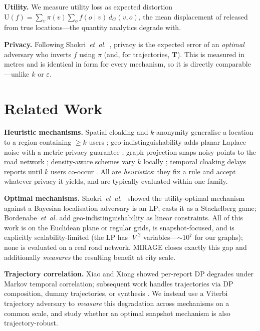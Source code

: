 \documentclass[11pt]{article}
\newcommand{\dG}{d_{G}}
\begin{document}
\textbf{Utility.} We measure utility loss as expected distortion
$\mathrm{U}(f)=\sum_v \pi(v)\sum_o f(o\mid v)\,\dG(v,o)$, the mean displacement of
released from true locations---the quantity analytics degrade with.

\textbf{Privacy.} Following Shokri~\emph{et~al.}~\cite{shokri2011}, privacy is the
expected error of an \emph{optimal} adversary who inverts $f$ using $\pi$ (and,
for trajectories, $\mathbf{T}$). This is measured in metres and is identical in
form for every mechanism, so it is directly comparable---unlike $k$ or
$\varepsilon$.

\section{Related Work}
\label{sec:related}
\textbf{Heuristic mechanisms.} Spatial cloaking and $k$-anonymity generalise a
location to a region containing $\ge k$ users \cite{sweeney2002,gruteser2003,
mokbel2006,duckham2005}; geo-indistinguishability adds planar Laplace noise with a
metric privacy guarantee \cite{andres2013,chatzikokolakis2013}; graph projection
snaps noisy points to the road network \cite{bordenabe2014}; density-aware schemes
vary $k$ locally \cite{niu2014}; temporal cloaking delays reports until $k$ users
co-occur \cite{gruteser2003}. All are \emph{heuristics}: they fix a rule and
accept whatever privacy it yields, and are typically evaluated within one family.

\textbf{Optimal mechanisms.} Shokri~\emph{et~al.}~\cite{shokri2012} showed the
utility-optimal mechanism against a Bayesian localisation adversary is an LP;
\cite{shokri2015pets} casts it as a Stackelberg game; Bordenabe~\emph{et~al.}
\cite{bordenabe2014} add geo-indistinguishability as linear constraints. All of
this work is on the Euclidean plane or regular grids, is snapshot-focused, and is
explicitly scalability-limited (the LP has $|V|^2$ variables---$\sim$$10^7$ for
our graphs); none is evaluated on a real road network. MIRAGE closes exactly this
gap and additionally \emph{measures} the resulting benefit at city scale.

\textbf{Trajectory correlation.} Xiao and Xiong \cite{xiao2015} showed per-report
DP degrades under Markov temporal correlation; subsequent work handles
trajectories via DP composition, dummy trajectories, or synthesis
\cite{du2023,hu2024,buchholz2024}. We instead use a Viterbi trajectory adversary
to \emph{measure} this degradation across mechanisms on a common scale, and study
whether an optimal snapshot mechanism is also trajectory-robust.
\end{document}
